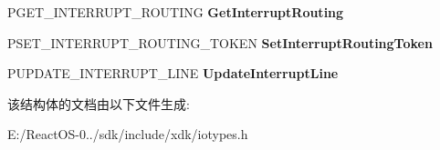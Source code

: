 \begin{DoxyCompactItemize}
\mbox{\label{struct___i_n_t___r_o_u_t_e___i_n_t_e_r_f_a_c_e___s_t_a_n_d_a_r_d_a79fad0d7ba982d693fc3d51186681496}} 
P\+G\+E\+T\+\_\+\+I\+N\+T\+E\+R\+R\+U\+P\+T\+\_\+\+R\+O\+U\+T\+I\+NG {\bfseries Get\+Interrupt\+Routing}
\item 
\mbox{\label{struct___i_n_t___r_o_u_t_e___i_n_t_e_r_f_a_c_e___s_t_a_n_d_a_r_d_afa3442157f6b0b462e604b5341ff8e83}} 
P\+S\+E\+T\+\_\+\+I\+N\+T\+E\+R\+R\+U\+P\+T\+\_\+\+R\+O\+U\+T\+I\+N\+G\+\_\+\+T\+O\+K\+EN {\bfseries Set\+Interrupt\+Routing\+Token}
\item 
\mbox{\label{struct___i_n_t___r_o_u_t_e___i_n_t_e_r_f_a_c_e___s_t_a_n_d_a_r_d_abb380b7bde5dafedba072ec6f080bb92}} 
P\+U\+P\+D\+A\+T\+E\+\_\+\+I\+N\+T\+E\+R\+R\+U\+P\+T\+\_\+\+L\+I\+NE {\bfseries Update\+Interrupt\+Line}
\end{DoxyCompactItemize}


该结构体的文档由以下文件生成\+:\begin{DoxyCompactItemize}
\item 
E\+:/\+React\+O\+S-\/0../sdk/include/xdk/iotypes.\+h\end{DoxyCompactItemize}
